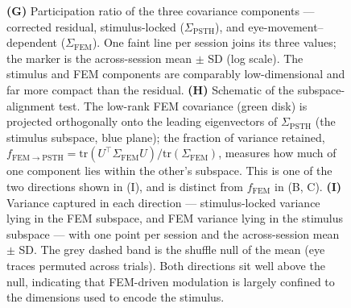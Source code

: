 \documentclass{lite}
\newcommand{\Cpsth}{\Sigma_{\text{PSTH}}}
\newcommand{\Cfem}{\Sigma_{\text{FEM}}}
\begin{document}
\begin{figure}[p]
{  \textbf{(G)} Participation ratio of the three covariance components --- corrected residual, stimulus-locked ($\Cpsth$), and eye-movement--dependent ($\Cfem$). One faint line per session joins its three values; the marker is the across-session mean $\pm$ SD (log scale). The stimulus and FEM components are comparably low-dimensional and far more compact than the residual.
  \textbf{(H)} Schematic of the subspace-alignment test. The low-rank FEM covariance (green disk) is projected orthogonally onto the leading eigenvectors of $\Cpsth$ (the stimulus subspace, blue plane); the fraction of variance retained, $f_{\mathrm{FEM}\to\mathrm{PSTH}} = \mathrm{tr}(U^\top\Sigma_{\text{FEM}}U)/\mathrm{tr}(\Sigma_{\text{FEM}})$, measures how much of one component lies within the other's subspace. This is one of the two directions shown in (I), and is distinct from $f_{\text{FEM}}$ in (B, C).
  \textbf{(I)} Variance captured in each direction --- stimulus-locked variance lying in the FEM subspace, and FEM variance lying in the stimulus subspace --- with one point per session and the across-session mean $\pm$ SD. The grey dashed band is the shuffle null of the mean (eye traces permuted across trials). Both directions sit well above the null, indicating that FEM-driven modulation is largely confined to the dimensions used to encode the stimulus.
  }
\end{figure}
\end{document}
